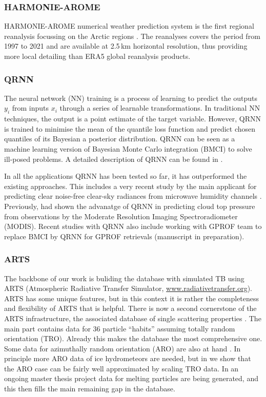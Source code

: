 \documentclass[12pt,oneside,a4paper]{article}
\begin{document}
\subsubsection{HARMONIE-AROME}
%
\label{sec:harmonie}
HARMONIE-AROME numerical weather prediction system is the first regional reanalysis focussing on the Arctic regions \citep{bengtsson:2017:harmo}. The reanalyses covers the period from 1997 to 2021 and are available at 2.5\,km horizontal resolution, thus providing more local detailing than ERA5 global reanalysis products.  
 
\subsubsection{QRNN}
%
\label{sec:qrnn}
The neural network (NN) training is a process of learning to predict the outputs {$y_i$} from inputs {$x_i$} through a series of learnable transformations. In traditional NN techniques, the output is a point estimate of the target variable. However, QRNN is trained to minimise the mean of the quantile loss function and predict chosen quantiles of its Bayesian a posterior distribution. QRNN can be seen as a machine learning version of Bayesian Monte Carlo integration (BMCI) to solve ill-posed problems. A detailed description of QRNN can be found in \citet{pfreundschuh:aneur:18}.  

In all the applications QRNN has been tested so far, it has outperformed the existing approaches. This includes a very recent study by the main applicant for predicting clear noise-free clear-sky radiances from microwave humidity channels \citep{kaur:2021:canma}. Previously, \citet{pfreundschuh:aneur:18} had shown the advanatge of QRNN in predicting cloud top pressure from observations by the Moderate Resolution Imaging Spectroradiometer (MODIS). Recent studies with QRNN also include working with GPROF team  to replace BMCI by QRNN for GPROF retrievals (manuscript in preparation).


\subsubsection{ARTS}
\label{sec:arts}
% 
The backbone of our work is buliding the database with simulated TB using ARTS (Atmospheric Radiative Transfer Simulator, \url{www.radiativetransfer.org}). ARTS has some unique features, but in this context it is rather the completeness and flexibility of ARTS that is
helpful. There is now a second cornerstone of the ARTS infrastructure, the
associated database of single scattering properties \citep{eriksson:agene:18}.
The main part contains data for 36 particle ``habits'' assuming totally random
orientation (TRO). Already this makes the database the most comprehensive one.
Some data for azimuthally random orientation (ARO) are also at hand
\citep{brath:micro:20,ekelund:micro:20}. In principle more ARO data of ice
hydrometeors are needed, but in \citet{baralakas:intro:21} we show that the ARO
case can be fairly well approximated by scaling TRO data. In an ongoing master
thesis project data for melting particles are being generated, and this then
fills the main remaining gap in the database.
\end{document}
